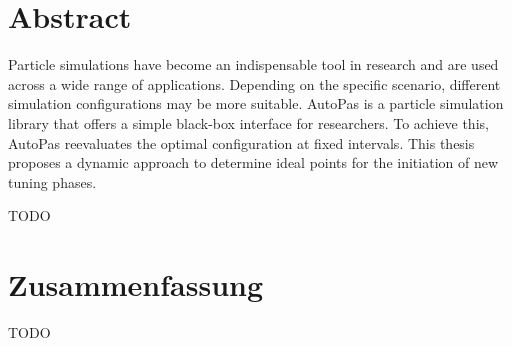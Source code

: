 \thispagestyle{plain}

\chapter*{Abstract}

Particle simulations have become an indispensable tool in research and are used across a wide range of applications. Depending on the specific scenario, different simulation configurations may be more suitable. AutoPas is a particle simulation library that offers a simple black-box interface for researchers. To achieve this, AutoPas reevaluates the optimal configuration at fixed intervals. This thesis proposes a dynamic approach to determine ideal points for the initiation of new tuning phases.

TODO

\MediaOptionLogicBlank

\chapter*{Zusammenfassung}

TODO

\MediaOptionLogicBlank